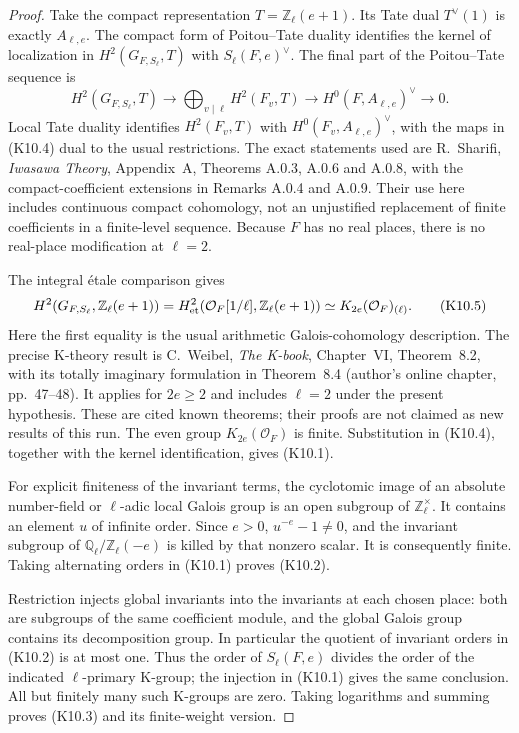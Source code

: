 \begin{proof}
Take the compact representation $T=\mathbb Z_\ell(e+1)$.
Its Tate dual $T^\vee(1)$ is exactly $A_{\ell,e}$.
The compact form of Poitou--Tate duality identifies the kernel
of localization in $H^2(G_{F,S_\ell},T)$ with
$S_\ell(F,e)^\vee$.  The final part of the Poitou--Tate sequence is
\[
 H^2(G_{F,S_\ell},T)\longrightarrow
 \bigoplus_{v\mid\ell}H^2(F_v,T)\longrightarrow
 H^0(F,A_{\ell,e})^\vee\longrightarrow0.                 \tag{K10.4}
\]
Local Tate duality identifies $H^2(F_v,T)$ with
$H^0(F_v,A_{\ell,e})^\vee$, with the maps in (K10.4) dual
to the usual restrictions.  The exact statements used are
R.~Sharifi, \emph{Iwasawa Theory}, Appendix~A, Theorems
A.0.3, A.0.6 and A.0.8, with the compact-coefficient extensions
in Remarks A.0.4 and A.0.9.  Their use here includes continuous
compact cohomology, not an unjustified replacement of finite
coefficients in a finite-level sequence.  Because $F$ has no
real places, there is no real-place modification at $\ell=2$.

The integral \'etale comparison gives
\[
 H^2(G_{F,S_\ell},\mathbb Z_\ell(e+1))
 =H^2_{\rm et}(\mathcal O_F[1/\ell],\mathbb Z_\ell(e+1))
 \simeq K_{2e}(\mathcal O_F)_{(\ell)}.                  \tag{K10.5}
\]
Here the first equality is the usual arithmetic Galois-cohomology
description.  The precise K-theory result is C.~Weibel,
\emph{The K-book}, Chapter~VI, Theorem~8.2, with its totally
imaginary formulation in Theorem~8.4 (author's online chapter,
pp.~47--48).  It applies for $2e\geq2$ and includes $\ell=2$
under the present hypothesis.  These are cited known theorems;
their proofs are not claimed as new results of this run.
The even group $K_{2e}(\mathcal O_F)$ is finite.  Substitution
in (K10.4), together with the kernel identification, gives
(K10.1).

For explicit finiteness of the invariant terms, the cyclotomic
image of an absolute number-field or $\ell$-adic local Galois
group is an open subgroup of $\mathbb Z_\ell^\times$.
It contains an element $u$ of infinite order.  Since $e>0$,
$u^{-e}-1\ne0$, and the invariant subgroup of
$\mathbb Q_\ell/\mathbb Z_\ell(-e)$ is killed by that nonzero
scalar.  It is consequently finite.  Taking alternating orders
in (K10.1) proves (K10.2).

Restriction injects global invariants into the invariants at
each chosen place: both are subgroups of the same coefficient
module, and the global Galois group contains its decomposition
group.  In particular the quotient of invariant orders in
(K10.2) is at most one.  Thus the order of $S_\ell(F,e)$ divides
the order of the indicated $\ell$-primary K-group; the injection
in (K10.1) gives the same conclusion.  All but finitely many
such K-groups are zero.  Taking logarithms and summing proves
(K10.3) and its finite-weight version.
\end{proof}

